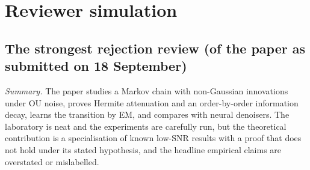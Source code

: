 \section{Reviewer simulation}
\label{sec:reviews}

\subsection{The strongest rejection review (of the paper as submitted on 18 September)}

\emph{Summary.} The paper studies a Markov chain with non-Gaussian innovations under OU noise, proves Hermite attenuation and an order-by-order information decay, learns the transition by EM, and compares with neural denoisers. The laboratory is neat and the experiments are carefully run, but the theoretical contribution is a specialisation of known low-SNR results with a proof that does not hold under its stated hypothesis, and the headline empirical claims are overstated or mislabelled.

